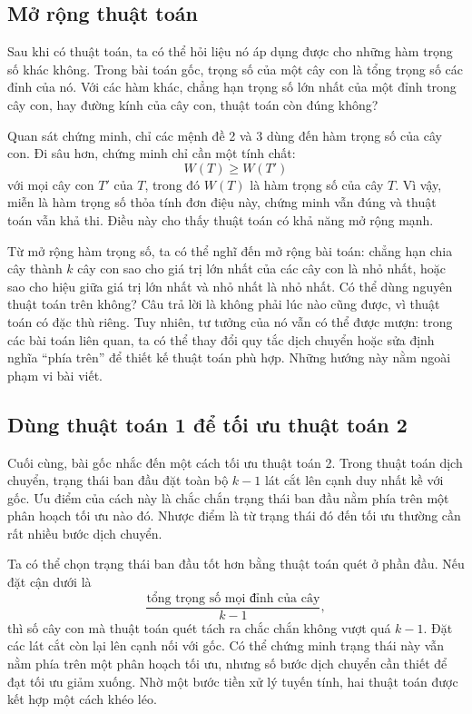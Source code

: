 \documentclass[11pt]{article}
\begin{document}
\subsection{Mở rộng thuật toán}

Sau khi có thuật toán, ta có thể hỏi liệu nó áp dụng được cho những hàm trọng
số khác không. Trong bài toán gốc, trọng số của một cây con là tổng trọng số
các đỉnh của nó. Với các hàm khác, chẳng hạn trọng số lớn nhất của một đỉnh
trong cây con, hay đường kính của cây con, thuật toán còn đúng không?

Quan sát chứng minh, chỉ các mệnh đề 2 và 3 dùng đến hàm trọng số của cây con.
Đi sâu hơn, chứng minh chỉ cần một tính chất:
\[
  W(T)\ge W(T')
\]
với mọi cây con $T'$ của $T$, trong đó $W(T)$ là hàm trọng số của cây $T$. Vì
vậy, miễn là hàm trọng số thỏa tính đơn điệu này, chứng minh vẫn đúng và thuật
toán vẫn khả thi. Điều này cho thấy thuật toán có khả năng mở rộng mạnh.

Từ mở rộng hàm trọng số, ta có thể nghĩ đến mở rộng bài toán: chẳng hạn chia
cây thành $k$ cây con sao cho giá trị lớn nhất của các cây con là nhỏ nhất,
hoặc sao cho hiệu giữa giá trị lớn nhất và nhỏ nhất là nhỏ nhất. Có thể dùng
nguyên thuật toán trên không? Câu trả lời là không phải lúc nào cũng được, vì
thuật toán có đặc thù riêng. Tuy nhiên, tư tưởng của nó vẫn có thể được mượn:
trong các bài toán liên quan, ta có thể thay đổi quy tắc dịch chuyển hoặc sửa
định nghĩa ``phía trên'' để thiết kế thuật toán phù hợp. Những hướng này nằm
ngoài phạm vi bài viết.

\subsection{Dùng thuật toán 1 để tối ưu thuật toán 2}

Cuối cùng, bài gốc nhắc đến một cách tối ưu thuật toán 2. Trong thuật toán
dịch chuyển, trạng thái ban đầu đặt toàn bộ $k-1$ lát cắt lên cạnh duy nhất
kề với gốc. Ưu điểm của cách này là chắc chắn trạng thái ban đầu nằm phía trên
một phân hoạch tối ưu nào đó. Nhược điểm là từ trạng thái đó đến tối ưu thường
cần rất nhiều bước dịch chuyển.

Ta có thể chọn trạng thái ban đầu tốt hơn bằng thuật toán quét ở phần đầu.
Nếu đặt cận dưới là
\[
  \frac{\text{tổng trọng số mọi đỉnh của cây}}{k-1},
\]
thì số cây con mà thuật toán quét tách ra chắc chắn không vượt quá $k-1$. Đặt
các lát cắt còn lại lên cạnh nối với gốc. Có thể chứng minh trạng thái này
vẫn nằm phía trên một phân hoạch tối ưu, nhưng số bước dịch chuyển cần thiết
để đạt tối ưu giảm xuống. Nhờ một bước tiền xử lý tuyến tính, hai thuật toán
được kết hợp một cách khéo léo.
\end{document}
